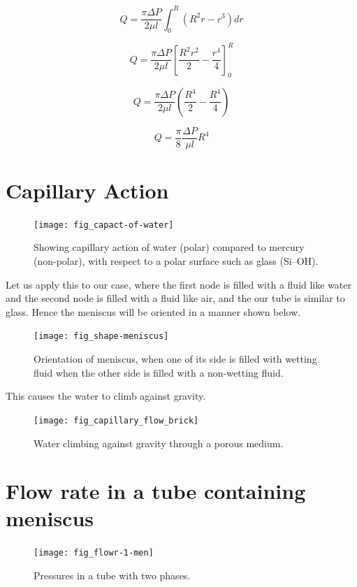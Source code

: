 	\[ Q =  \frac{\pi \Delta P}{2 \mu l} \int_{0}^{R} (R^2r - r^3)dr \]
	
	\[ Q =  \frac{\pi \Delta P}{2 \mu l} \left[ \frac{R^2r^2}{2} - \frac{r^4}{4} \right]_{0}^{R} \]
	
	\[ Q =  \frac{\pi \Delta P}{2 \mu l} \left( \frac{R^4}{2} - \frac{R^4}{4} \right) \]
	
	\begin{equation} \label{eq:flow-rate}
		\boxed{Q = \frac{\pi}{8} \frac{\Delta P}{\mu l} R^4}
	\end{equation}

\section{Capillary Action}

	\begin{figure}[H]
		\texttt{[image: fig\_capact-of-water]}
		\caption{Showing capillary action of water (polar) compared to mercury (non-polar), with respect to a polar surface such as glass (Si–OH).}
		\label{fig_capact-of-water}
	\end{figure}
	
	Let us apply this to our case, where the first node is filled with a fluid like water and the second node is filled with a fluid like air, and the our tube is similar to glass. Hence the meniscus will be oriented in a manner shown below.
	
	\begin{figure}[H]
		\texttt{[image: fig\_shape-meniscus]}
		\caption{Orientation of meniscus, when one of its side is filled with wetting fluid when the other side is filled with a non-wetting fluid.}
		\label{fig_shape-meniscus}
	\end{figure}
	
	This causes the water to climb against gravity.
	
	\begin{figure}[H]
		\texttt{[image: fig\_capillary\_flow\_brick]}
		\caption{Water climbing against gravity through a porous medium.}
		\label{fig_capillary_flow_brick}
	\end{figure}



\section{Flow rate in a tube containing meniscus}

	\begin{figure}[H]
		\texttt{[image: fig\_flowr-1-men]}
		\caption{Pressures in a tube with two phases.}
		\label{fig_flowr-1-men}
	\end{figure}

